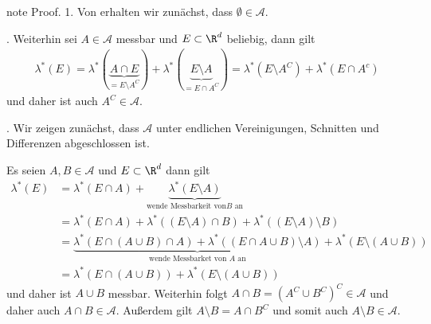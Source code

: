 \documentclass[letterpaper,10pt,german]{jupyterBook}
\begin{document}
\begin{sphinxadmonition}{note}
\sphinxAtStartPar
Proof. 1. Von {\hyperref[\detokenize{masstheorie/masstheorie:thm:lebesguemes}]{}} erhalten wir zunächst, dass \(\emptyset\in\mathcal{A}\).

. Weiterhin sei \(A\in\mathcal{A}\) messbar und \(E\subset\R^d\) beliebig, dann gilt
\begin{equation*}
\begin{split}\lambda^\ast(E) = \lambda^\ast(\underbrace{A\cap E}_{=E\setminus A^C}) + \lambda^\ast(\underbrace{E\setminus A}_{=E\cap A^C}) = 
\lambda^\ast(E\setminus A^C) + \lambda^\ast(E\cap A^c) \end{split}
\end{equation*}
\sphinxAtStartPar
und daher ist auch \(A^C\in\mathcal{A}\).

. Wir zeigen zunächst, dass \(\mathcal{A}\) unter endlichen Vereinigungen, Schnitten und Differenzen abgeschlossen ist.

\sphinxAtStartPar
Es seien \(A,B\in\mathcal{A}\) und \(E\subset\R^d\) dann gilt
\begin{equation*}
\begin{split}\lambda^\ast(E) &= \lambda^\ast(E\cap A) + \underbrace{\lambda^\ast(E\setminus A)}_{\text{wende Messbarkeit von} B\text{ an}}\\
&=\lambda^\ast(E\cap A) + \lambda^\ast((E\setminus A)\cap B) + \lambda^\ast((E\setminus A)\setminus B)\\
&=
\underbrace{\lambda^\ast(E\cap (A\cup B)\cap A) + \lambda^\ast((E\cap A\cup B)\setminus A)}_{\text{wende Messbarket von } A \text{ an}} + \lambda^\ast(E\setminus(A\cup B))\\
&=
\lambda^\ast(E\cap (A\cup B)) + \lambda^\ast(E\setminus(A\cup B))\end{split}
\end{equation*}
\sphinxAtStartPar
und daher ist \(A\cup B\) messbar. Weiterhin folgt \(A\cap B = (A^C\cup B^C)^C\in\mathcal{A}\) und daher auch \(A\cap B\in\mathcal{A}\). Außerdem gilt \(A\setminus B = A\cap B^C\) und somit auch \(A\setminus B\in\mathcal{A}\).


\end{sphinxadmonition}
\end{document}
